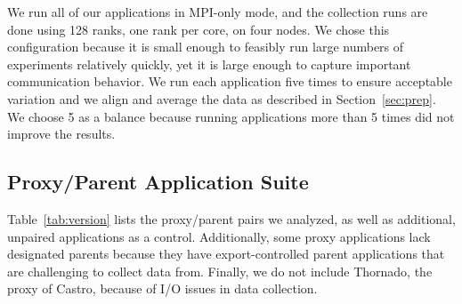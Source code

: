 We run all of our applications in MPI-only mode, and the collection
runs are done using 128 ranks, one rank per core, on four nodes.
We chose this configuration because it is small enough to feasibly 
run large numbers of experiments relatively quickly, yet it is large 
enough to capture important communication behavior.  We run each application
five times to ensure acceptable variation and we align and average the data 
as described in Section~\ref{sec:prep}. We choose 5 as a balance because running applications more than 5 times did not improve the results. %


\subsection{Proxy/Parent Application Suite}
Table~\ref{tab:version} lists the proxy/parent pairs we analyzed, as well as additional, unpaired applications as a control.
%
Additionally, some proxy applications lack designated parents because they have export-controlled parent applications that are challenging to collect data from. Finally, we do not include Thornado, the proxy of Castro, because of I/O issues in data collection. %


